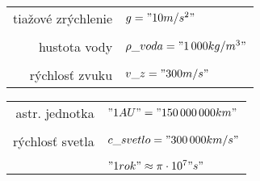 \documentclass[vyfuk,\classoptions]{fksgeneric}
\begin{document}
\begin{framed}
\begin{multicols}{2}

\begin{center}
\begin{tabular}{r l}
tiažové zrýchlenie & $g = "10 m/s^2"$ \\ \\
hustota vody & $\rho\_{voda} = "1\,000 kg/m^3"$ \\ \\
rýchlosť zvuku & $v\_z = "300 m/s"$
\end{tabular}
\end{center}

\columnbreak

\begin{center}
\begin{tabular}{r l}
astr. jednotka & $"1 AU" = "150\,000\,000 km"$ \\ \\
rýchlosť svetla & $c\_{svetlo} = "300\,000 km/s"$ \\ \\
& $"1 rok" \approx \pi \cdot 10^7" s"$  
\end{tabular}
\end{center}
\end{multicols}
\end{framed}
\end{document}

